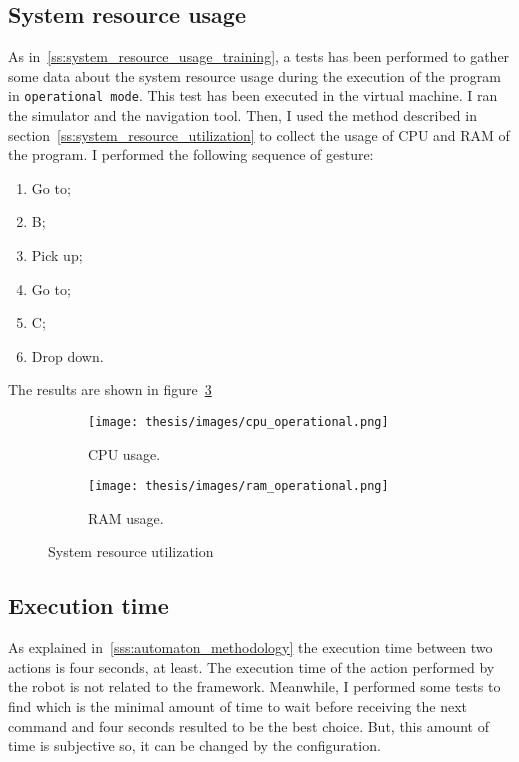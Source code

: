 \documentclass[../thesis.tex]{subfiles}
\begin{document}
\subsection{System resource usage}
As in~\ref{ss:system_resource_usage_training}, a tests has been performed to gather some data about the system resource usage during the execution of the program in \texttt{operational mode}. This test has been executed in the virtual machine. I ran the simulator and the navigation tool. Then, I used the method described in section~\ref{ss:system_resource_utilization} to collect the usage of CPU and RAM of the program. I performed the following sequence of gesture:
\begin{enumerate}
    \item Go to;
    \item B;
    \item Pick up;
    \item Go to;
    \item C;
    \item Drop down.
\end{enumerate}
The results are shown in figure~\ref{fig:system_resource_graphs}

\begin{figure}[H]
    \centering
    \begin{subfigure}[b]{0.45\textwidth}
        \centering
        \texttt{[image: thesis/images/cpu\_operational.png]}
        \caption{CPU usage.}
        \label{fig:cpu_usage}
    \end{subfigure}
    \hfill
    \begin{subfigure}[b]{0.45\textwidth}
        \centering
        \texttt{[image: thesis/images/ram\_operational.png]}
        \caption{RAM usage.}
        \label{fig:ram_usage}
    \end{subfigure}
    \caption{System resource utilization}
    \label{fig:system_resource_graphs}
\end{figure}

\subsection{Execution time}
As explained in~\ref{sss:automaton_methodology} the execution time between two actions is four seconds, at least. The execution time of the action performed by the robot is not related to the framework. Meanwhile, I performed some tests to find which is the minimal amount of time to wait before receiving the next command and four seconds resulted to be the best choice. But, this amount of time is subjective so, it can be changed by the configuration.
\end{document}
